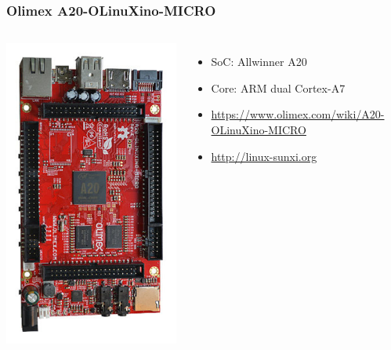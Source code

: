 \documentclass[xetex,table]{beamer}
\begin{document}
\begin{frame}
  \frametitle{Olimex A20-OLinuXino-MICRO}
  \begin{columns}
    \includegraphics[width=\textwidth]{images/A20-OLinuXino-MICRO.jpeg}
    \begin{itemize}
    \item SoC: Allwinner A20
    \item Core: ARM dual Cortex-A7
    \item \url{https://www.olimex.com/wiki/A20-OLinuXino-MICRO}
    \item \url{http://linux-sunxi.org}
    \end{itemize}
  \end{columns}
\end{frame}
\end{document}
